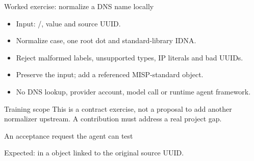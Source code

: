 \begin{frame}{Worked exercise: normalize a DNS name locally}
    \begin{itemize}
        \item Input: /, value and source UUID.
        \item Normalize case, one root dot and standard-library IDNA.
        \item Reject malformed labels, unsupported types, IP literals and bad UUIDs.
        \item Preserve the input; add a referenced MISP-standard object.
        \item No DNS lookup, provider account, model call or runtime agent framework.
    \end{itemize}
    \begin{alertblock}{Training scope}
        This is a contract exercise, not a proposal to add another normalizer upstream.
        A contribution must address a real project gap.
    \end{alertblock}
\end{frame}

\begin{frame}[fragile]{An acceptance request the agent can test}
    
    \small
    Expected:  in a  object
    linked to the original source UUID.
\end{frame}

